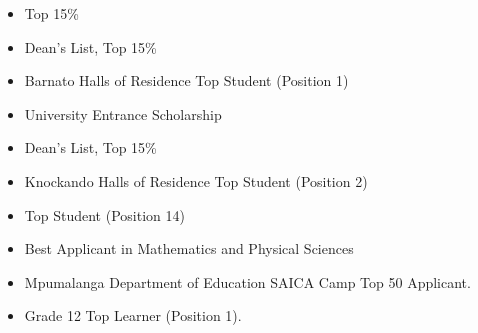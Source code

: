 \documentclass[10pt,a4paper,ragged2e]{altacv}
\begin{document}




\begin{itemize}
\item Top 15\%
\end{itemize}

\begin{itemize}
\item Dean's List, Top 15\%
\item Barnato Halls of Residence Top Student (Position 1)
\end{itemize}

\begin{itemize}
\item University Entrance Scholarship
\item Dean's List, Top 15\%
\item Knockando Halls of Residence Top Student (Position 2)
\end{itemize}


\begin{itemize}
\item Top Student (Position 14)
\item Best Applicant in Mathematics and Physical Sciences
\end{itemize}


\begin{itemize}
\item Mpumalanga Department of Education SAICA Camp Top 50 Applicant.
\item Grade 12 Top Learner (Position 1).
\end{itemize}


\clearpage






\end{document}
